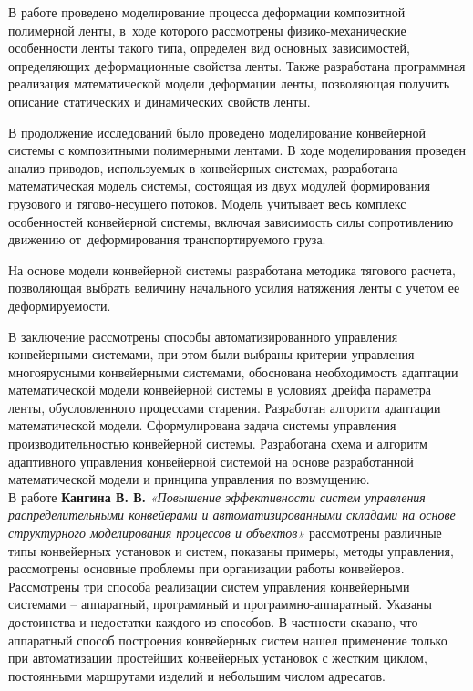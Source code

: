 В работе проведено моделирование процесса деформации композитной полимерной ленты, в~ходе которого рассмотрены физико-механические особенности ленты такого типа, определен вид основных зависимостей, определяющих деформационные свойства ленты. Также разработана программная реализация математической модели деформации ленты, позволяющая получить описание статических и динамических свойств ленты. 

В продолжение исследований было проведено моделирование конвейерной системы с композитными полимерными лентами. В ходе моделирования проведен анализ приводов, используемых в конвейерных системах,  разработана математическая модель системы, состоящая из двух модулей формирования грузового и тягово-несущего потоков. Модель учитывает весь комплекс особенностей конвейерной системы, включая зависимость силы сопротивлению движению от~деформирования транспортируемого груза. 

На основе модели конвейерной системы разработана методика тягового расчета, позволяющая выбрать величину начального усилия натяжения ленты с учетом ее деформируемости. 

В заключение рассмотрены способы автоматизированного управления конвейерными системами, при этом были выбраны критерии управления многоярусными конвейерными системами, обоснована необходимость адаптации математической модели конвейерной системы в условиях дрейфа параметра ленты, обусловленного процессами старения. Разработан алгоритм адаптации математической модели. Сформулирована задача системы управления производительностью конвейерной системы. Разработана схема и алгоритм адаптивного управления конвейерной системой на основе разработанной математической модели и принципа управления по возмущению.\\

В работе \textbf{ Кангина В. В.} \textit{«Повышение эффективности систем управления распределительными конвейерами и автоматизированными складами на основе структурного моделирования процессов и объектов»} \cite{vkangin} рассмотрены различные типы конвейерных установок и систем, показаны примеры, методы управления, рассмотрены основные проблемы при организации работы конвейеров. Рассмотрены три способа реализации систем управления конвейерными системами -- аппаратный, программный и программно-аппаратный. Указаны достоинства и недостатки каждого из способов. В частности сказано, что аппаратный способ построения конвейерных систем нашел применение только при автоматизации простейших конвейерных установок с жестким циклом, постоянными маршрутами изделий и небольшим числом адресатов.

